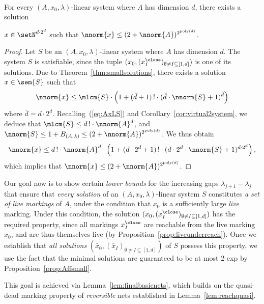 \begin{prop}\label{prop:Affsmall}
\hfill\\
For every $(A,x_0,\lambda)$-linear system where $A$ has 
 dimension $d$,
there exists a solution 
	\begin{center}
	$x\in\setN^{d\cdot 2^d}$ such that 
	$\nnorm{x}\leq (2+\nnorm{A})^{2^{\text{poly}(d)}}$.
	\end{center}
	\end{prop}	
\begin{proof} 
Let $S$ be an $(A,x_0,\lambda)$-linear system where  $A$ has dimension $d$.
The system $S$ is
satisfiable, since the tuple $(x_0,(x^\close_I)_{\emptyset\neq I\subseteq [1,d]})$ is one
of its solutions.
	Due to Theorem~\ref{thm:smallsolutions},
there exists a solution
	$x\in\sem{S}$ such that
	\[\nnorm{x}\leq
		\mlcm{S} \cdot \left(1+ (\bar{d}+1)\,!\cdot (\bar{d}\cdot
		\nnorm{S}+1)^{\bar{d}}\right)\]
	where 	$\bar{d}=d\cdot 2^d$.
Recalling~(\ref{eq:AxLS})
and Corollary~\ref{cor:virtual2system}, we deduce that
	$\mlcm{S}\leq d\,!\cdot\nnorm{A}^d$, and $\nnorm{S}\leq
	1+B_{(A,\lambda)}\leq 
	(2+\nnorm{A})^{2^{\text{poly}(d)}}$. 
We thus obtain
\[\nnorm{x}\leq d\,!\cdot\nnorm{A}^d\cdot
 \left(1+ (d\cdot 2^d+1)\,!\cdot (d\cdot 2^d\cdot
		\nnorm{S}+1)^{d\cdot 2^d}\right),\]
which implies that 
	$\nnorm{x}\leq(2+\nnorm{A})^{2^{\text{poly}(d)}}$.
\end{proof}

\noindent
Our goal now is to show certain \emph{lower bounds} for 
the increasing gaps
$\lambda_{j+1}-\lambda_j$ that ensure
that \emph{every solution} 
of an $(A,x_0,\lambda)$-linear system $S$
constitutes \emph{a set
of live markings} of $A$, under the condition that $x_0$ is a sufficiently
large \emph{live} marking.
Under this condition, the solution $(x_0,(x^\close_I)_{\emptyset\neq I\subseteq[1,d]})$ 
has the required property, since all markings $x^\close_I$ are reachable from
the live marking $x_0$, and are thus themselves live (by
Proposition~\ref{prop:liveunderreach}).
Once we establish that \emph{all solutions}
$(\bar{x}_0,(\bar{x}_I)_{\emptyset\neq I\subseteq[1,d]})$ of $S$ 
possess this property, we use the fact 
that the minimal solutions are guaranteed to be at most 2-exp by
Proposition~\ref{prop:Affsmall}.

This goal is achieved via Lemma~\ref{lem:finalbasicnets}, which builds on the quasi-dead marking property of \emph{reversible} nets established in Lemma~\ref{lem:reachquasi}.

